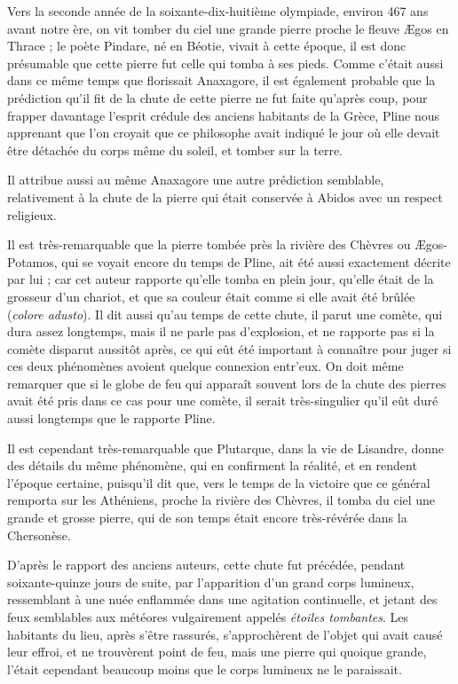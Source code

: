 \documentclass[a4paper, 12pt, oneside, french]{article}
\begin{document}
Vers la seconde année de la soixante-dix-huitième olympiade, environ 467 ans avant notre ère, on vit tomber du ciel une grande pierre proche le fleuve Ægos en Thrace ; le poète Pindare, né en Béotie, vivait à cette époque, il est donc présumable que cette pierre fut celle qui tomba à ses pieds. Comme c'était aussi dans ce même temps que florissait Anaxagore, il est également probable que la prédiction qu'il fit de la chute de cette pierre ne fut faite qu'après coup, pour frapper davantage l'esprit crédule des anciens habitants de la Grèce, Pline nous apprenant que l'on croyait que ce philosophe avait indiqué le jour où elle devait être détachée du corps même du soleil, et tomber sur la terre.

Il attribue aussi au même Anaxagore une autre prédiction semblable, relativement à la chute de la pierre qui était conservée à Abidos avec un respect religieux.

Il est très-remarquable que la pierre tombée près la rivière des Chèvres ou Ægos-Potamos, qui se voyait encore du temps de Pline, ait été aussi exactement décrite par lui ; car cet auteur rapporte qu'elle tomba en plein jour, qu'elle était de la grosseur d'un chariot, et que sa couleur était comme si elle avait été brûlée (\emph{colore adusto}). Il dit aussi qu'au temps de cette chute, il parut une comète, qui dura assez longtemps, mais il ne parle pas d'explosion, et ne rapporte pas si la comète disparut aussitôt après, ce qui eût été important à connaître pour juger si ces deux phénomènes avoient quelque connexion entr'eux. On doit même remarquer que si le globe de feu qui apparaît souvent lors de la chute des pierres avait été pris dans ce cas pour une comète, il serait très-singulier qu'il eût duré aussi longtemps que le rapporte Pline.

Il est cependant très-remarquable que Plutarque, dans la vie de Lisandre, donne des détails du même phénomène, qui en confirment la réalité, et en rendent l'époque certaine, puisqu'il dit que, vers le temps de la victoire que ce général remporta sur les Athéniens, proche la rivière des Chèvres, il tomba du ciel une grande et grosse pierre, qui de son temps était encore très-révérée dans la Chersonèse.

D'après le rapport des anciens auteurs, cette chute fut précédée, pendant soixante-quinze jours de suite, par l'apparition d'un grand corps lumineux, ressemblant à une nuée enflammée dans une agitation continuelle, et jetant des feux semblables aux météores vulgairement appelés \emph{étoiles tombantes}. Les habitants du lieu, après s'être rassurés, s'approchèrent de l'objet qui avait causé leur effroi, et ne trouvèrent point de feu, mais une pierre qui quoique grande, l'était cependant beaucoup moins que le corps lumineux ne le paraissait.
\end{document}
